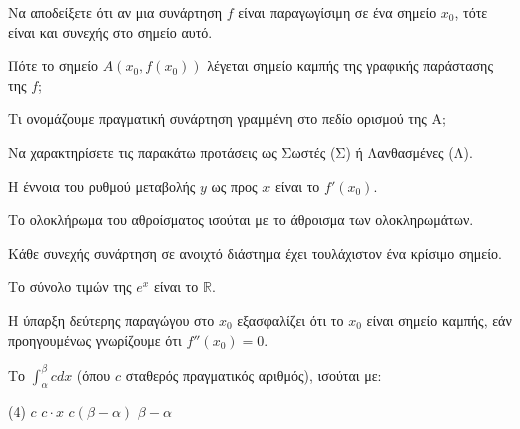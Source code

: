 \documentclass[11pt,a4paper]{article}
\newcommand{\kerkissans}[1]{{\fontfamily{maksf}\selectfont \textbf{#1}}}
\renewcommand{\textdexiakeraia}{}
\newcommand{\dint}{\displaystyle\int}
\newcommand\themanum{A}
\newcounter{thema}[section]
\renewcommand{\thethema}{\arabic{thema}}
\newcommand{\Thema}{\refstepcounter{thema}{\textbf{\textcolor{black}{\faPenSquare\ \  \large \kerkissans{\textbf{\thethemaο\hspace{2mm}Διαγώνισμα - Θέμα \themanum}}}}}\hspace{0mm}}{}
\newenvironment{thema}[1]
{\begin{tcolorbox}[title=\Thema\kerkissans{\textbf{\large{  #1}}},breakable,
enhanced standard,titlerule=0pt,toprule=0pt, rightrule=0pt, bottomrule=0pt,
colback=white,left=0mm,top=1mm,bottom=0mm,
boxrule=0pt,
colframe=white,leftrule=0mm,sharp corners,coltitle=black]
\renewcommand{\themanum}{#1}}
{\end{tcolorbox}}
\begin{document}
\begin{thema}{A}
\begin{erwthma}
    \item Να αποδείξετε ότι αν μια συνάρτηση $f$ είναι παραγωγίσιμη σε ένα σημείο $x_0$, τότε είναι και συνεχής στο σημείο αυτό.
    \item Πότε το σημείο $A(x_0, f(x_0))$ λέγεται σημείο καμπής της γραφικής παράστασης της $f$;
    \item Τι ονομάζουμε πραγματική συνάρτηση γραμμένη στο πεδίο ορισμού της Α;
    \item Να χαρακτηρίσετε τις παρακάτω προτάσεις ως Σωστές (Σ) ή Λανθασμένες (Λ).
    \begin{alist}
        \item Η έννοια του ρυθμού μεταβολής $y$ ως προς $x$ είναι το $f'(x_0)$.
        \item Το ολοκλήρωμα του αθροίσματος ισούται με το άθροισμα των ολοκληρωμάτων.
        \item Κάθε συνεχής συνάρτηση σε ανοιχτό διάστημα έχει τουλάχιστον ένα κρίσιμο σημείο.
        \item Το σύνολο τιμών της $e^x$ είναι το $\mathbb{R}$.
        \item Η ύπαρξη δεύτερης παραγώγου στο $x_0$ εξασφαλίζει ότι το $x_0$ είναι σημείο καμπής, εάν προηγουμένως γνωρίζουμε ότι $f''(x_0)=0$.
    \end{alist}
    \item Το $\dint_\alpha^\beta c dx$ (όπου $c$ σταθερός πραγματικός αριθμός), ισούται με:
    \begin{tasks}[label=\let\textdexiakeraia\relax\alph*.](4)
        \task $c$
        \task $c\cdot x$
        \task $c(\beta - \alpha)$
        \task $\beta - \alpha$
    \end{tasks}
\end{erwthma}
\end{thema}
\vspace{1cm}
\end{document}
